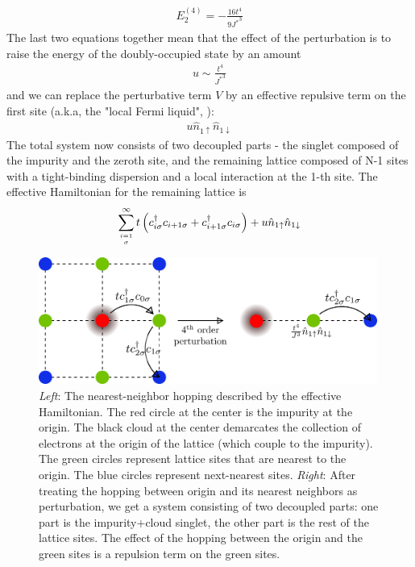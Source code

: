 \documentclass[twoside]{report}
\numberwithin{equation}{section}
\begin{document}
\begin{equation}\begin{aligned}
	E_2^{(4)} = -\frac{16t^4}{9{J^*}^3}
\end{aligned}\end{equation}
The last two equations together mean that the effect of the perturbation is to raise the energy of the doubly-occupied state by an amount
\begin{equation}\begin{aligned}
	u \sim \frac{t^4}{{J^*}^3}
\end{aligned}\end{equation}
and we can replace the perturbative term \(V\) by an effective repulsive term on the first site (a.k.a, the "local Fermi liquid", \cite{nozieres}):
\begin{equation}\begin{aligned}
	u\hat n_{1 \uparrow}\hat n_{1 \downarrow}
\end{aligned}\end{equation}
The total system now consists of two decoupled parts - the singlet composed of the impurity and the zeroth site, and the remaining lattice composed of N-1 sites with a tight-binding dispersion and a local interaction at the 1-th site. The effective Hamiltonian for the remaining lattice is
\begin{equation}\begin{aligned}
	\sum_{i=1\atop{\sigma}}^\infty t\left(c^\dagger_{i\sigma}c_{i+1 \sigma} + c^\dagger_{i+1 \sigma}c_{i\sigma}\right) + u \hat n_{1 \uparrow} \hat n_{1 \downarrow}
\end{aligned}\end{equation}
\begin{figure}[htpb]
	\centering
	\includegraphics[width=0.99\textwidth]{../figures/lattice_eff.png}
	\caption{\textit{Left}: The nearest-neighbor hopping described by the effective Hamiltonian. The red circle at the center is the impurity at the origin. The black cloud at the center demarcates the collection of electrons at the origin of the lattice (which couple to the impurity). The green circles represent lattice sites that are nearest to the origin. The blue circles represent next-nearest sites. \textit{Right}: After treating the hopping between origin and its nearest neighbors as perturbation, we get a system consisting of two decoupled parts: one part is the impurity+cloud singlet, the other part is the rest of the lattice sites. The effect of the hopping between the origin and the green sites is a repulsion term on the green sites.}
\end{figure}
\end{document}
